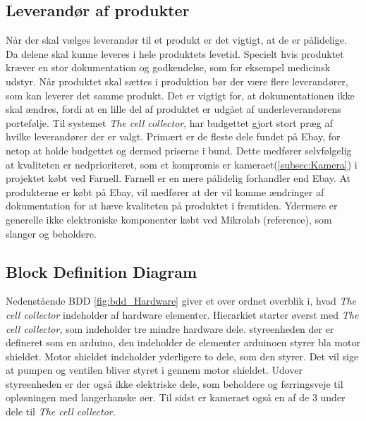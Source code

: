 \subsection{Leverandør af produkter}
Når der skal vælges leverandør til et produkt er det vigtigt, at de er pålidelige. Da delene skal kunne leveres i hele produktets levetid. Specielt hvis produktet kræver en stor dokumentation og godkendelse, som for eksempel medicinsk udstyr. Når produktet skal sættes i produktion bør der være flere leverandører, som kan leverer det samme produkt. Det er vigtigt for, at dokumentationen ikke skal ændres, fordi at en lille del af produktet er udgået af underleverandørens portefølje.
Til systemet \textit{The cell collector}, har budgettet gjort stort præg af hvilke leverandører der er valgt. Primært er de fleste dele fundet på Ebay, for netop at holde budgettet og dermed priserne i bund. Dette medfører selvfølgelig at kvaliteten er nedprioriteret, som et kompromis er kameraet(\ref{subsec:Kamera}) i projektet købt ved Farnell. Farnell er en mere pålidelig forhandler end Ebay. At produkterne er købt på Ebay, vil medfører at der vil komme ændringer af dokumentation for  at hæve kvaliteten på produktet i fremtiden. Ydermere er generelle ikke elektroniske komponenter købt ved Mikrolab  (reference), som slanger og beholdere. 

     


 
 
 
 
 \newpage
\subsection{Block Definition Diagram}  \label{sub:bdd_hardware}
Nedenstående BDD \ref{fig:bdd_Hardware} giver et over ordnet overblik i, hvad \textit{The cell collector} indeholder af hardware elementer. Hierarkiet starter øverst med \textit{The cell collector}, som indeholder tre mindre hardware dele. styreenheden der er defineret som en arduino, den indeholder de elementer arduinoen styrer bla motor shieldet. Motor shieldet indeholder yderligere to dele, som den styrer. Det vil sige at pumpen og ventilen bliver styret i gennem motor shieldet. Udover styreenheden er der også ikke elektriske dele, som beholdere og førringsveje til opløsningen med langerhanske øer. Til sidst er kameraet også en af de 3 under dele til \textit{The cell collector}.

